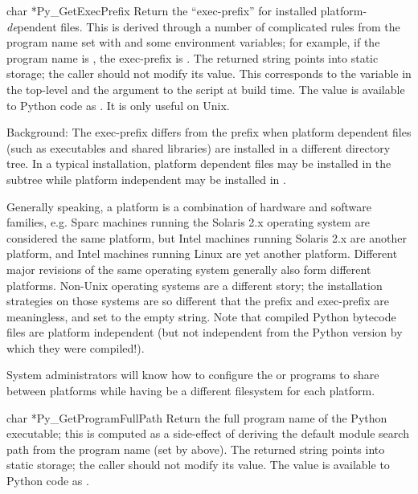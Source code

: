 \begin{cfuncdesc}{char *}{Py_GetExecPrefix}{}
Return the ``exec-prefix'' for installed platform-\emph{de}pendent 
files.  This is derived through a number of complicated rules from the 
program name set with  and some environment 
variables; for example, if the program name is 
, the exec-prefix is 
.  The returned string points into static storage; 
the caller should not modify its value.  This corresponds to the 
 variable in the top-level  and the 
 argument to the  script at build 
time.  The value is available to Python code as 
.  It is only useful on Unix.

Background: The exec-prefix differs from the prefix when platform 
dependent files (such as executables and shared libraries) are 
installed in a different directory tree.  In a typical installation, 
platform dependent files may be installed in the 
 subtree while platform independent may be 
installed in .

Generally speaking, a platform is a combination of hardware and 
software families, e.g.  Sparc machines running the Solaris 2.x 
operating system are considered the same platform, but Intel machines 
running Solaris 2.x are another platform, and Intel machines running 
Linux are yet another platform.  Different major revisions of the same 
operating system generally also form different platforms.  Non-Unix 
operating systems are a different story; the installation strategies 
on those systems are so different that the prefix and exec-prefix are 
meaningless, and set to the empty string.  Note that compiled Python 
bytecode files are platform independent (but not independent from the 
Python version by which they were compiled!).

System administrators will know how to configure the  or 
 programs to share  between platforms 
while having  be a different filesystem for each 
platform.
\end{cfuncdesc}

\begin{cfuncdesc}{char *}{Py_GetProgramFullPath}{}
Return the full program name of the Python executable; this is 
computed as a side-effect of deriving the default module search path 
from the program name (set by  above).  The 
returned string points into static storage; the caller should not 
modify its value.  The value is available to Python code as 
.
\end{cfuncdesc}


